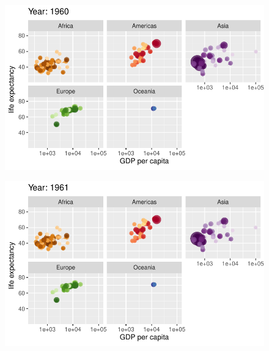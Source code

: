 \documentclass[
  letterpaper,
  DIV=11,
  numbers=noendperiod]{scrartcl}
\begin{document}
\begin{figure}[H]

{\centering \includegraphics{class05_files/figure-pdf/unnamed-chunk-24-16.pdf}

}

\end{figure}

\begin{figure}[H]

{\centering \includegraphics{class05_files/figure-pdf/unnamed-chunk-24-17.pdf}

}

\end{figure}
\end{document}
